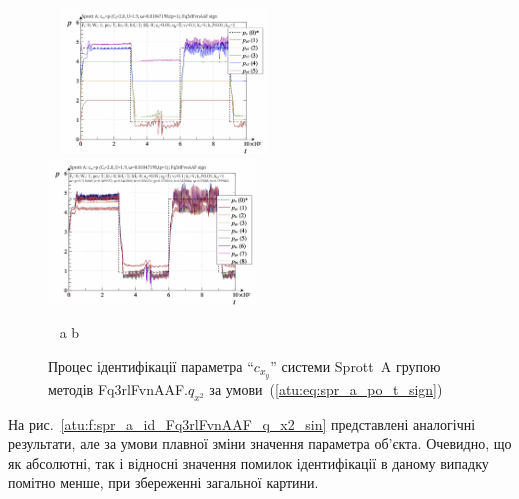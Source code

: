 \begin{figure}[htb!]
\begin{center}
  ~ \hfill
    \includegraphics[width=0.49\textwidth]{p/cha/spr_a/Fq3rlFvnAAF_x2/sprott_a_id-p_t_pi_Fq3rlFvnAAF_sign.png}
    \hfill
    \includegraphics[width=0.49\textwidth]{p/cha/spr_a/Fq3rlFvnAAF_x2/sprott_a_id-p_t_p_Fq3rlFvnAAF_sign.png}
  \hfill ~
\end{center}
  \vspace{-1.0ex}
  \begin{center}
    ~ \hfill a \hfill\hfill b \hfill ~
  \end{center}
\caption{Процес ідентифікації параметра ``$c_{x_y}$'' системи Sprott~A групою методів Fq3rlFvnAAF.$q_{x^2}$ за умови~(\ref{atu:eq:spr_a_po_t_sign})}
  \label{atu:f:spr_a_id_Fq3rlFvnAAF_q_x2_sign}
\end{figure}

На рис.~\ref{atu:f:spr_a_id_Fq3rlFvnAAF_q_x2_sin} представлені аналогічні
результати, але за умови плавної зміни значення параметра
об'єкта. Очевидно, що як абсолютні, так і відносні значення
помилок ідентифікації в даному випадку помітно менше, при
збереженні загальної картини. %

